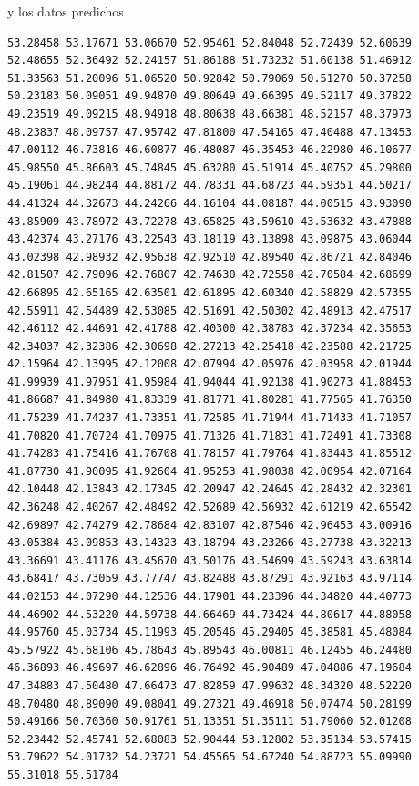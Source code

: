 \documentclass[12pt,a4paper,twoside,openright,titlepage,final]{article}
\begin{document}
y los datos predichos 

\begin{verbatim}
53.28458 53.17671 53.06670 52.95461 52.84048 52.72439 52.60639 
52.48655 52.36492 52.24157 51.86188 51.73232 51.60138 51.46912 
51.33563 51.20096 51.06520 50.92842 50.79069 50.51270 50.37258 
50.23183 50.09051 49.94870 49.80649 49.66395 49.52117 49.37822 
49.23519 49.09215 48.94918 48.80638 48.66381 48.52157 48.37973 
48.23837 48.09757 47.95742 47.81800 47.54165 47.40488 47.13453 
47.00112 46.73816 46.60877 46.48087 46.35453 46.22980 46.10677 
45.98550 45.86603 45.74845 45.63280 45.51914 45.40752 45.29800 
45.19061 44.98244 44.88172 44.78331 44.68723 44.59351 44.50217 
44.41324 44.32673 44.24266 44.16104 44.08187 44.00515 43.93090 
43.85909 43.78972 43.72278 43.65825 43.59610 43.53632 43.47888 
43.42374 43.27176 43.22543 43.18119 43.13898 43.09875 43.06044 
43.02398 42.98932 42.95638 42.92510 42.89540 42.86721 42.84046
42.81507 42.79096 42.76807 42.74630 42.72558 42.70584 42.68699 
42.66895 42.65165 42.63501 42.61895 42.60340 42.58829 42.57355 
42.55911 42.54489 42.53085 42.51691 42.50302 42.48913 42.47517 
42.46112 42.44691 42.41788 42.40300 42.38783 42.37234 42.35653 
42.34037 42.32386 42.30698 42.27213 42.25418 42.23588 42.21725 
42.15964 42.13995 42.12008 42.07994 42.05976 42.03958 42.01944 
41.99939 41.97951 41.95984 41.94044 41.92138 41.90273 41.88453 
41.86687 41.84980 41.83339 41.81771 41.80281 41.77565 41.76350 
41.75239 41.74237 41.73351 41.72585 41.71944 41.71433 41.71057 
41.70820 41.70724 41.70975 41.71326 41.71831 41.72491 41.73308 
41.74283 41.75416 41.76708 41.78157 41.79764 41.83443 41.85512 
41.87730 41.90095 41.92604 41.95253 41.98038 42.00954 42.07164 
42.10448 42.13843 42.17345 42.20947 42.24645 42.28432 42.32301
42.36248 42.40267 42.48492 42.52689 42.56932 42.61219 42.65542 
42.69897 42.74279 42.78684 42.83107 42.87546 42.96453 43.00916 
43.05384 43.09853 43.14323 43.18794 43.23266 43.27738 43.32213 
43.36691 43.41176 43.45670 43.50176 43.54699 43.59243 43.63814 
43.68417 43.73059 43.77747 43.82488 43.87291 43.92163 43.97114 
44.02153 44.07290 44.12536 44.17901 44.23396 44.34820 44.40773 
44.46902 44.53220 44.59738 44.66469 44.73424 44.80617 44.88058 
44.95760 45.03734 45.11993 45.20546 45.29405 45.38581 45.48084 
45.57922 45.68106 45.78643 45.89543 46.00811 46.12455 46.24480 
46.36893 46.49697 46.62896 46.76492 46.90489 47.04886 47.19684 
47.34883 47.50480 47.66473 47.82859 47.99632 48.34320 48.52220 
48.70480 48.89090 49.08041 49.27321 49.46918 50.07474 50.28199 
50.49166 50.70360 50.91761 51.13351 51.35111 51.79060 52.01208
52.23442 52.45741 52.68083 52.90444 53.12802 53.35134 53.57415 
53.79622 54.01732 54.23721 54.45565 54.67240 54.88723 55.09990 
55.31018 55.51784
\end{verbatim}
\end{document}
